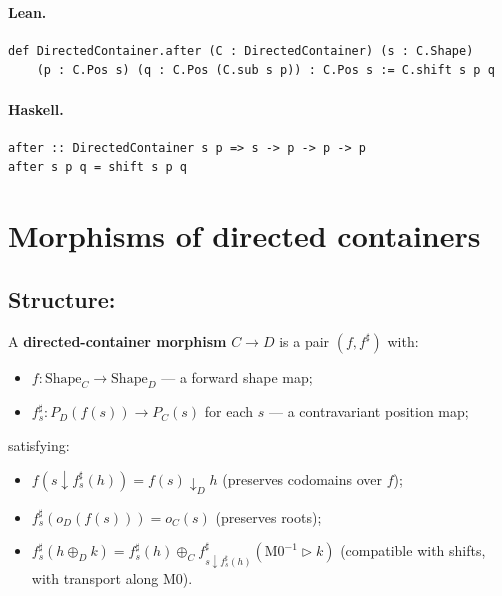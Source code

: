 \documentclass[11pt,a4paper]{article}
\begin{document}
\paragraph{Lean.}
\begin{lstlisting}[style=lean]
def DirectedContainer.after (C : DirectedContainer) (s : C.Shape)
    (p : C.Pos s) (q : C.Pos (C.sub s p)) : C.Pos s := C.shift s p q
\end{lstlisting}

\paragraph{Haskell.}
\begin{lstlisting}[style=haskell]
after :: DirectedContainer s p => s -> p -> p -> p
after s p q = shift s p q
\end{lstlisting}


\section{Morphisms of directed containers}

\subsection{Structure: }

\begin{defn}
A \textbf{directed-container morphism} $C \to D$ is a pair $(f, f^\sharp)$
with:
\begin{itemize}
  \item $f : \mathrm{Shape}_C \to \mathrm{Shape}_D$ --- a forward shape map;
  \item $f^\sharp_s : P_D(f(s)) \to P_C(s)$ for each $s$ --- a contravariant
        position map;
\end{itemize}
satisfying:
\begin{itemize}
  \item[M0.] $f(s \downarrow f^\sharp_s(h)) = f(s) \downarrow_D h$
             \hfill (preserves codomains over $f$);
  \item[M1.] $f^\sharp_s(o_D(f(s))) = o_C(s)$
             \hfill (preserves roots);
  \item[M2.] $f^\sharp_s(h \oplus_D k)
             = f^\sharp_s(h) \oplus_C f^\sharp_{s \downarrow f^\sharp_s(h)}
               (\mathrm{M0}^{-1} \triangleright k)$
             \hfill (compatible with shifts, with transport along M0).
\end{itemize}
\end{defn}
\end{document}
